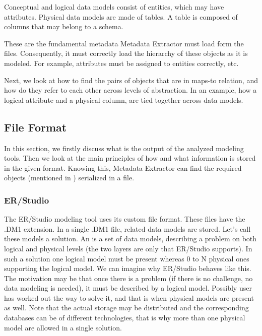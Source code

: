 \label{main_modeled_objects}
Conceptual and logical data models consist of entities, which may have attributes.
Physical data models are made of tables. A table is composed of columns that may belong to a schema.

These are the fundamental metadata Metadata Extractor must load form the files. 
Consequently, it must correctly load the hierarchy of these objects as it is modeled. For example, attributes must be assigned to entities correctly, etc.

Next, we look at how to find the pairs of objects that are in maps-to relation, and how do they refer to each other across levels of abstraction.
In an example, how a logical attribute and a physical column, are tied together across data models.

\subsection{File Format}

In this section, we firstly discuss what is the output of the analyzed modeling tools. Then we look at the main principles of how and what information is stored in the given format. Knowing this, Metadata Extractor can find the required objects (mentioned in ) serialized in a file.

\subsubsection{ER/Studio}
\label{subsec:dm1_format}

The ER/Studio modeling tool uses its custom file format. These files have the .DM1 extension. 
In a single .DM1 file, related data models are stored. Let's call these models a solution. An  is a set of data models, describing a problem on both logical and physical levels (the two layers are only that ER/Studio supports). 
In such a solution one logical model must be present whereas 0 to N physical ones supporting the logical model.
We can imagine why ER/Studio behaves like this. The motivation may be that once there is a problem (if there is no challenge, no data modeling is needed), it must be described by a logical model. 
Possibly user has worked out the way to solve it, and that is when physical models are present as well.
Note that the actual storage may be distributed and the corresponding databases can be of different technologies, that is why more than one physical model are allowed in a single solution.

